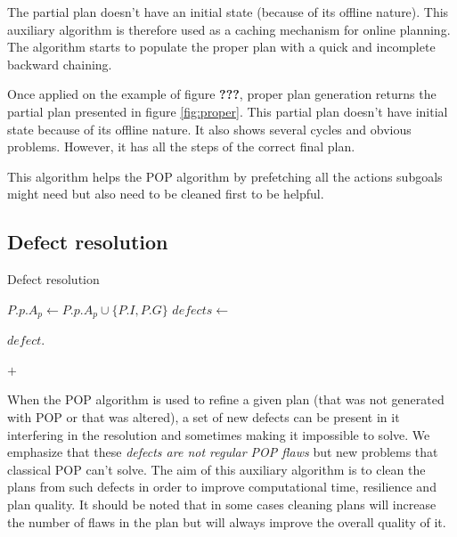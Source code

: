 \documentclass[]{article}
\begin{document}
The partial plan doesn't have an initial state (because of its offline
nature). This auxiliary algorithm is therefore used as a caching
mechanism for online planning. The algorithm starts to populate the
proper plan with a quick and incomplete backward chaining.

Once applied on the example of figure \textbf{???}, proper plan
generation returns the partial plan presented in figure
\ref{fig:proper}. This partial plan doesn't have initial state because
of its offline nature. It also shows several cycles and obvious
problems. However, it has all the steps of the correct final plan.

This algorithm helps the POP algorithm by prefetching all the actions
subgoals might need but also need to be cleaned first to be helpful.

\hypertarget{defects}{\subsection{Defect resolution}\label{defects}}

\begin{algorithm}\caption{Defect resolution}\label{defectresolution}\begin{algorithmic}[1]

\State {}
\State {}
\State \(P.p.A_p \gets P.p.A_p \cup \{P.I, P.G\}\)
\State \(defects \gets\) 
\State {} \EndFunction

 \State \(defect.\)
 \EndFor
\EndFunction

 \State \Return {}
\(+\)  \EndFunction

\end{algorithmic}\end{algorithm}

When the POP algorithm is used to refine a given plan (that was not
generated with POP or that was altered), a set of new defects can be
present in it interfering in the resolution and sometimes making it
impossible to solve. We emphasize that these \emph{defects are not
regular POP flaws} but new problems that classical POP can't solve. The
aim of this auxiliary algorithm is to clean the plans from such defects
in order to improve computational time, resilience and plan quality. It
should be noted that in some cases cleaning plans will increase the
number of flaws in the plan but will always improve the overall quality
of it.
\end{document}
